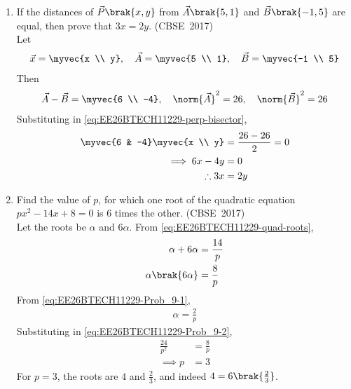 \begin{enumerate}[label=\thesubsection.\arabic*, ref=\thesubsection.\theenumi]
\begin{align}
	AP + BP = AB, \quad CR + DR = CD, \quad AS + DS = DA, \quad BQ + CQ = BC
\end{align}
Substituting in the above,
\begin{align}
	AB + CD = BC + DA
\end{align}
\item 
If the distances of $\vec{P}\brak{x, y}$ from $\vec{A}\brak{5, 1}$ and $\vec{B}\brak{-1, 5}$ are equal, then prove that $3x = 2y$.
\hfill (CBSE~2017)
\\
\solution
Let
\begin{align}
	\vec{x} = \myvec{x \\ y}, \quad \vec{A} = \myvec{5 \\ 1}, \quad \vec{B} = \myvec{-1 \\ 5}
\end{align}
Then
\begin{align}
	\vec{A} - \vec{B} = \myvec{6 \\ -4}, \quad
	\norm{\vec{A}}^2 = 26, \quad \norm{\vec{B}}^2 = 26
\end{align}
Substituting in \eqref{eq:EE26BTECH11229-perp-bisector},
\begin{align}
	\myvec{6 & -4}\myvec{x \\ y} &= \frac{26 - 26}{2} = 0
	\\
	\implies 6x - 4y &= 0
	\\
	\therefore 3x &= 2y
\end{align}
\item 
Find the value of $p$, for which one root of the quadratic equation $px^2 - 14x + 8 = 0$ is 6 times the other.
\hfill (CBSE~2017)
\\
\solution
Let the roots be $\alpha$ and $6\alpha$. From \eqref{eq:EE26BTECH11229-quad-roots},
\begin{align}
	\alpha + 6\alpha &= \frac{14}{p}
	\label{eq:EE26BTECH11229-Prob_9-1}
	\\
	\alpha \brak{6\alpha} &= \frac{8}{p}
	\label{eq:EE26BTECH11229-Prob_9-2}
\end{align}
From \eqref{eq:EE26BTECH11229-Prob_9-1}, 
\begin{align}
	\alpha = \frac{2}{p}
\end{align}
Substituting in \eqref{eq:EE26BTECH11229-Prob_9-2},
\begin{align}
	\frac{24}{p^2} &= \frac{8}{p}
	\\
	\implies p &= 3
\end{align}
For $p=3$, the roots are $4$ and $\frac{2}{3}$, and indeed $4 = 6\brak{\frac{2}{3}}$.

\end{enumerate}
